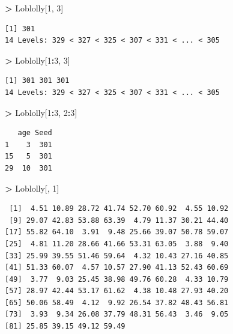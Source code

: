 \documentclass[]{krantz}
\makeatletter
\newenvironment{Shaded}{\begin{snugshade}}{\end{snugshade}}
\newcommand{\DecValTok}[1]{\textcolor[rgb]{0.06,0.06,0.06}{#1}}
\newcommand{\NormalTok}[1]{#1}
\newcommand{\OperatorTok}[1]{\textcolor[rgb]{0.43,0.43,0.43}{\textbf{#1}}}
\newcommand{\StringTok}[1]{\textcolor[rgb]{0.5,0.5,0.5}{#1}}
\newenvironment{kframe}{%
\medskip{}
\setlength{\fboxsep}{.8em}
 \def\at@end@of@kframe{}%
 \ifinner\ifhmode%
  \def\at@end@of@kframe{\end{minipage}}%
  \begin{minipage}{\columnwidth}%
 \fi\fi%
 \def\FrameCommand##1{\hskip\@totalleftmargin \hskip-\fboxsep
 \colorbox{shadecolor}{##1}\hskip-\fboxsep
     \hskip-\linewidth \hskip-\@totalleftmargin \hskip\columnwidth}%
 \MakeFramed {\advance\hsize-\width
   \@totalleftmargin\z@ \linewidth\hsize
   \@setminipage}}%
 {\par\unskip\endMakeFramed%
 \at@end@of@kframe}
\renewenvironment{Shaded}{\begin{kframe}}{\end{kframe}}
\makeatother
\begin{document}
\begin{Shaded}
\begin{Highlighting}[]
\OperatorTok{>}\StringTok{ }\NormalTok{Loblolly[}\DecValTok{1}\NormalTok{, }\DecValTok{3}\NormalTok{]}
\end{Highlighting}
\end{Shaded}

\begin{verbatim}
[1] 301
14 Levels: 329 < 327 < 325 < 307 < 331 < ... < 305
\end{verbatim}

\begin{Shaded}
\begin{Highlighting}[]
\OperatorTok{>}\StringTok{ }\NormalTok{Loblolly[}\DecValTok{1}\OperatorTok{:}\DecValTok{3}\NormalTok{, }\DecValTok{3}\NormalTok{]}
\end{Highlighting}
\end{Shaded}

\begin{verbatim}
[1] 301 301 301
14 Levels: 329 < 327 < 325 < 307 < 331 < ... < 305
\end{verbatim}

\begin{Shaded}
\begin{Highlighting}[]
\OperatorTok{>}\StringTok{ }\NormalTok{Loblolly[}\DecValTok{1}\OperatorTok{:}\DecValTok{3}\NormalTok{, }\DecValTok{2}\OperatorTok{:}\DecValTok{3}\NormalTok{]}
\end{Highlighting}
\end{Shaded}

\begin{verbatim}
   age Seed
1    3  301
15   5  301
29  10  301
\end{verbatim}

\begin{Shaded}
\begin{Highlighting}[]
\OperatorTok{>}\StringTok{ }\NormalTok{Loblolly[, }\DecValTok{1}\NormalTok{]}
\end{Highlighting}
\end{Shaded}

\begin{verbatim}
 [1]  4.51 10.89 28.72 41.74 52.70 60.92  4.55 10.92
 [9] 29.07 42.83 53.88 63.39  4.79 11.37 30.21 44.40
[17] 55.82 64.10  3.91  9.48 25.66 39.07 50.78 59.07
[25]  4.81 11.20 28.66 41.66 53.31 63.05  3.88  9.40
[33] 25.99 39.55 51.46 59.64  4.32 10.43 27.16 40.85
[41] 51.33 60.07  4.57 10.57 27.90 41.13 52.43 60.69
[49]  3.77  9.03 25.45 38.98 49.76 60.28  4.33 10.79
[57] 28.97 42.44 53.17 61.62  4.38 10.48 27.93 40.20
[65] 50.06 58.49  4.12  9.92 26.54 37.82 48.43 56.81
[73]  3.93  9.34 26.08 37.79 48.31 56.43  3.46  9.05
[81] 25.85 39.15 49.12 59.49
\end{verbatim}
\end{document}
